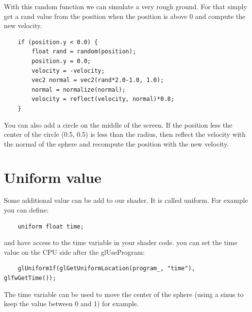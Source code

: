 \documentclass{article}
\begin{document}
With this random function we can simulate a very rough ground. For that simply get a rand value from the position when the position is above 0 and compute the new velocity.
\begin{lstlisting}
	if (position.y < 0.0) {
		float rand = random(position);
		position.y = 0.0;
		velocity = -velocity; 
		vec2 normal = vec2(rand*2.0-1.0, 1.0);
		normal = normalize(normal);
		velocity = reflect(velocity, normal)*0.8;
	}
\end{lstlisting}

You can also add a circle on the middle of the screen. If the position less the center of the circle (0.5, 0.5) is less than the radius, then reflect the velocity with the normal of the sphere and recompute the position with the new velocity.

\section{Uniform value}
Some additional value can be add to our shader. It is called uniform. For example you can define: 
\begin{lstlisting}
	uniform float time;
\end{lstlisting}
and have access to the time variable in your shader code. you can set the time value on the CPU side after the glUseProgram:
\begin{lstlisting}
	glUniform1f(glGetUniformLocation(program_, "time"), glfwGetTime());
\end{lstlisting}
The time variable can be used to move the center of the sphere (using a sinus to keep the value between 0 and 1) for example.
\end{document}
